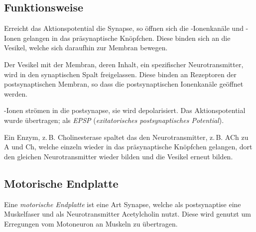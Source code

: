 \documentclass{article}
\begin{document}
\subsection{Funktionsweise} 
Erreicht das Aktionspotential die Synapse, so öffnen sich die -Ionenkanäle und -Ionen gelangen in das präsynaptische Knöpfchen. Diese binden sich an die Vesikel, welche sich daraufhin zur Membran bewegen.
 
Der Vesikel  mit der Membran, deren Inhalt, ein spezifischer Neurotransmitter, wird in den synaptischen Spalt freigelassen. Diese binden an Rezeptoren der postsynaptischen Membran, so dass die postsynaptischen Ionenkanäle geöffnet werden.
 
-Ionen strömen in die postsynapse, sie wird depolarisiert. Das Aktionspotential wurde übertragen; als \emph{EPSP} (\emph{exitatorisches postsynaptisches Potential}).
 
Ein Enzym, z.\,B. Cholinesterase spaltet das den Neurotransmitter, z.\,B. ACh zu A und Ch, welche einzeln wieder in das präsynaptische Knöpfchen gelangen, dort den gleichen Neurotransmitter wieder bilden und die Vesikel erneut bilden. 

\subsection{Motorische Endplatte}
Eine \emph{motorische Endplatte} ist eine Art Synapse, welche als postsynaptise eine Muskelfaser und als Neurotransmitter Acetylcholin nutzt. Diese wird genutzt um Erregungen vom Motoneuron an Muskeln zu übertragen.
\end{document}
